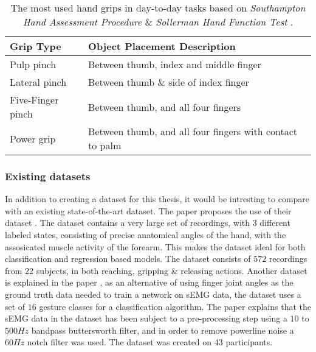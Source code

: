 \documentclass[../main.tex]{subfiles}
\begin{document}
\begin{table}[H]
\begin{center}
\begin{tabular}{ |l|l| } 
 \hline
 Grip Type & Object Placement Description \\ 
 \hline
 Pulp pinch & Between thumb, index and middle finger \\ 
 Lateral pinch & Between thumb \& side of index finger \\ 
 Five-Finger pinch & Between thumb, and all four fingers \\ 
 Power grip & Between thumb, and all four fingers with contact to palm \\ 
 \hline
\end{tabular}
\caption{The most used hand grips in day-to-day tasks based on \textit{Southampton Hand Assessment Procedure} \cite{shap} \& \textit{Sollerman Hand Function Test} \cite{sollerman}.}
\label{tab:grips}
\end{center}
\end{table}


\subsubsection{Existing datasets}

In addition to creating a dataset for this thesis, it would be intresting to compare with an existing state-of-the-art dataset.
The paper \cite{jarque2019} proposes the use of their dataset \cite{kinmusdataset}.
The dataset contains a very large set of recordings, with 3 different labeled states, consisting of precise anatomical angles of the hand, with the assosicated muscle activity of the forearm.
This makes the dataset ideal for both classification and regression based models.
The dataset consists of $572$ recordings from $22$ subjects, in both reaching, gripping \& releasing actions.
Another dataset is explained in the paper \cite{ashirbad2022}, as an alternative of using finger joint angles as the ground truth data needed to train a network on sEMG data, the dataset uses a set of $16$ gesture classes for a classification algorithm.
The paper explains that the sEMG data in the dataset has been subject to a pre-processing step using a $10$ to $500Hz$ bandpass buttersworth filter, and in order to remove powerline noise a $60Hz$ notch filter was used.
The dataset was created on $43$ participants.

\end{document}

